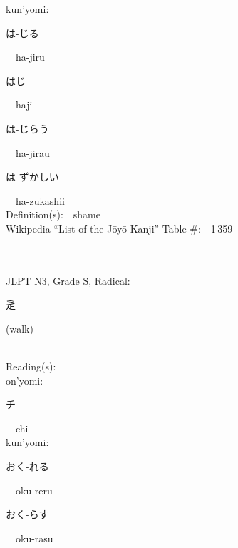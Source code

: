 \begin{multicols}{2}
{\hspace*{1em}}kun'yomi:\ \ \\
{\hspace*{2em}}{\begin{CJK}{UTF8}{min} は-じる \end{CJK}}\ \ ha-jiru\ \ \\
{\hspace*{2em}}{\begin{CJK}{UTF8}{min} はじ \end{CJK}}\ \ haji\ \ \\
{\hspace*{2em}}{\begin{CJK}{UTF8}{min} は-じらう \end{CJK}}\ \ ha-jirau\ \ \\
{\hspace*{2em}}{\begin{CJK}{UTF8}{min} は-ずかしい \end{CJK}}\ \ ha-zukashii\ \ \\
Definition(s):\ \ shame \\
Wikipedia ``List of the J\=oy\=o Kanji'' Table \#:\ \ 1\,359 \\
\ \ \\
{\fontsize{34pt}{40pt}  }\ \ \\  %
{JLPT N3, Grade S, Radical:\ \ {\begin{CJK}{UTF8}{min} 辵 \end{CJK}} (walk) } \\
Reading(s):\ \ \\
{\hspace*{1em}}on'yomi:\ \ \\
{\hspace*{2em}}{\begin{CJK}{UTF8}{min} チ \end{CJK}}\ \ chi\ \ \\
{\hspace*{1em}}kun'yomi:\ \ \\
{\hspace*{2em}}{\begin{CJK}{UTF8}{min} おく-れる \end{CJK}}\ \ oku-reru\ \ \\
{\hspace*{2em}}{\begin{CJK}{UTF8}{min} おく-らす \end{CJK}}\ \ oku-rasu\ \ \\

\end{multicols}
